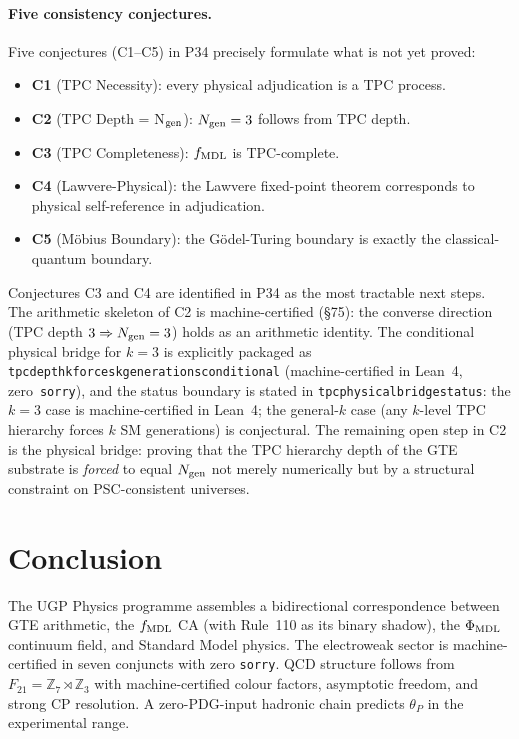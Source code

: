 \documentclass[11pt]{article}
\theoremstyle{remark}
\newcommand{\ZS}{\mathbb{Z}_7}
\newcommand{\Zthree}{\mathbb{Z}_3}
\newcommand{\Ngen}{N_{\rm gen}}
\newcommand{\fmdl}{f_{\rm MDL}}
\newcommand{\lean}[1]{%
  \penalty-100
  \begingroup\def\_{\textunderscore\allowbreak}\texttt{#1}\endgroup}
\newcommand{\phimdl}{\Phi_{\rm MDL}}
\newcommand{\Ftwentyone}{F_{21}}
\begin{document}
\paragraph{Five consistency conjectures.}
Five conjectures (C1--C5) in P34 precisely formulate what is not yet proved:
\begin{itemize}[nosep]
  \item \textbf{C1} (TPC Necessity): every physical adjudication is a TPC process.
  \item \textbf{C2} (TPC Depth = N$_{\rm gen}$): $\Ngen = 3$ follows from TPC depth.
  \item \textbf{C3} (TPC Completeness): $\fmdl$ is TPC-complete.
  \item \textbf{C4} (Lawvere-Physical): the Lawvere fixed-point theorem corresponds to
    physical self-reference in adjudication.
  \item \textbf{C5} (Möbius Boundary): the Gödel-Turing boundary is exactly the
    classical-quantum boundary.
\end{itemize}
Conjectures C3 and C4 are identified in P34 as the most tractable next steps.
    The arithmetic skeleton of C2 is machine-certified (\S75):
    the converse direction (TPC depth $3 \Rightarrow \Ngen = 3$) holds as an arithmetic
    identity. The conditional physical bridge for $k=3$ is explicitly packaged as
    \lean{tpc\_depth\_k\_forces\_k\_generations\_conditional} (machine-certified in Lean~4, zero~\texttt{sorry}),
    and the status boundary is stated in \lean{tpc\_physical\_bridge\_status}: the
    $k=3$ case is machine-certified in Lean~4; the general-$k$ case (any $k$-level TPC hierarchy
    forces $k$ SM generations) is conjectural.
    The remaining open step in C2 is the physical bridge: proving that the
    TPC hierarchy depth of the GTE substrate is \emph{forced} to equal $\Ngen$
    not merely numerically but by a structural constraint on PSC-consistent universes.

\section{Conclusion}
\label{sec:conclusion}

The UGP Physics programme assembles a bidirectional correspondence between
GTE arithmetic, the $\fmdl$ CA (with Rule~110 as its binary shadow), the $\phimdl$
continuum field, and Standard Model physics.
The electroweak sector is machine-certified in seven conjuncts with zero \texttt{sorry}.
QCD structure follows from $\Ftwentyone = \ZS \rtimes \Zthree$ with machine-certified
colour factors, asymptotic freedom, and strong CP resolution.
A zero-PDG-input hadronic chain predicts $\theta_P$ in the experimental range.
\end{document}
